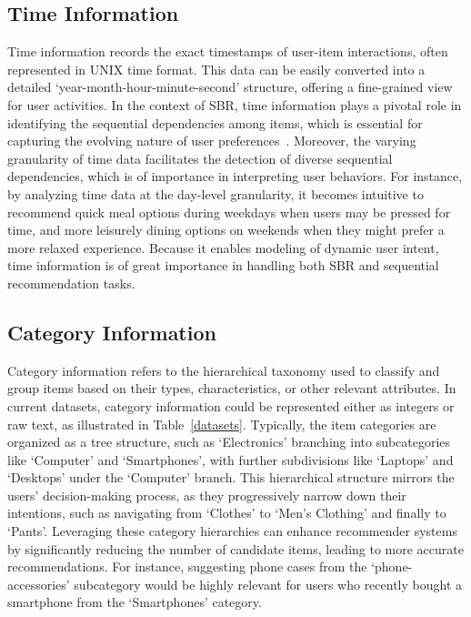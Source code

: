 \documentclass[lettersize,journal]{IEEEtran}
\begin{document}

\subsection{Time Information}
Time information records the exact timestamps of user-item interactions, often represented in UNIX time format. This data can be easily converted into a detailed ‘year-month-hour-minute-second’ structure, offering a fine-grained view for user activities. In the context of SBR, time information plays a pivotal role in identifying the sequential dependencies among items, which is essential for capturing the evolving nature of user preferences~\cite{YangH@SIGIR2023,Li@SIGIR2022Short,Rashed@RecSys2022,Long@TKDD2024}. Moreover, the varying granularity of time data facilitates the detection of diverse sequential dependencies, which is of importance in interpreting user behaviors. For instance, by analyzing time data at the day-level granularity, it becomes intuitive to recommend quick meal options during weekdays when users may be pressed for time, and more leisurely dining options on weekends when they might prefer a more relaxed experience. Because it enables modeling of dynamic user intent, time information is of great importance in handling both SBR and sequential recommendation tasks.



\subsection{Category Information}
{Category} information refers to the hierarchical taxonomy used to classify and group items based on their types, characteristics, or other relevant attributes. In current datasets, category information could be represented either as integers or raw text, as illustrated in Table~\ref{datasets}. Typically, the item categories are organized as a tree structure, such as `Electronics' branching into subcategories like `Computer' and `Smartphones', with further subdivisions like `Laptops' and `Desktops' under the `Computer' branch. This hierarchical structure mirrors the users' decision-making process, as they progressively narrow down their intentions, such as navigating from `Clothes' to `Men's Clothing' and finally to `Pants'.  Leveraging these category hierarchies can enhance recommender systems by significantly reducing the number of candidate items, leading to more accurate recommendations. For instance, suggesting phone cases from the `phone-accessories' subcategory would be highly relevant for users who recently bought a smartphone from the `Smartphones' category.
\end{document}
